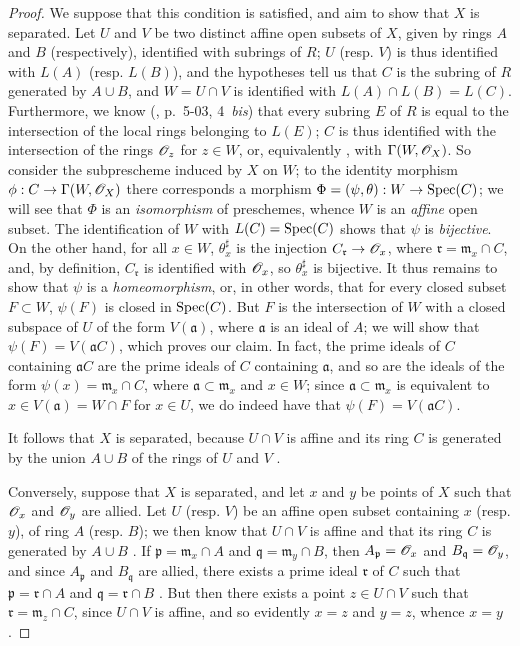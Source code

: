 \begin{proof}
\label{proof-1.8.2.2}
We suppose that this condition is satisfied, and aim to show that $X$ is separated.
Let $U$ and $V$ be two distinct affine open subsets of $X$, given by rings $A$ and $B$ (respectively), identified with subrings of $R$;
$U$ (resp. $V$) is thus identified  with $L(A)$ (resp. $L(B)$), and the hypotheses tell us  that $C$ is the subring of $R$ generated by $A\cup B$, and $W=U\cap V$ is identified with $L(A)\cap L(B)=L(C)$.
Furthermore, we know (\cite{I-1}, p.~5-03, 4~\emph{bis}) that every subring $E$ of $R$ is equal to the intersection of the local rings belonging to $L(E)$;
$C$ is thus identified with the intersection of the rings $\mathscr{O}_z$ for $z\in W$, or, equivalently , with $\Gamma(W,\mathscr{O}_X)$.
So consider the subprescheme induced by $X$ on $W$;
to the identity morphism $\vphi: C\to\Gamma(W,\sh{O}_X)$ there corresponds  a morphism $\Phi=(\psi,\theta):W\to\Spec(C)$;
we will see that $\Phi$ is an \emph{isomorphism} of preschemes, whence $W$ is an \emph{affine} open subset.
The identification of $W$ with $L(C)=\operatorname{Spec}(C)$ shows that $\psi$ is \emph{bijective}.
On the other hand, for all $x\in W$, $\theta_x^\sharp$ is the injection $C_\mathfrak{r}\to\sh{O}_x$, where $\mathfrak{r}=\mathfrak{m}_x\cap C$, and, by definition, $C_\mathfrak{r}$ is identified with $\mathscr{O}_x$, so $\theta_x^\sharp$ is bijective.
It thus remains to show that $\psi$ is a \emph{homeomorphism}, or, in other words, that for every closed subset $F\subset W$, $\psi(F)$ is closed in
$\operatorname{Spec}(C)$.
But $F$ is the intersection of $W$ with a closed subspace of $U$ of the form $V(\mathfrak{a})$, where $\mathfrak{a}$ is an ideal of $A$;
we will show that $\psi(F)=V(\mathfrak{a}C)$, which proves our claim.
In fact, the prime ideals of $C$ containing $\mathfrak{a}C$ are the prime ideals of $C$ containing $\mathfrak{a}$, and so are the ideals of the form $\psi(x)=\mathfrak{m}_x\cap C$, where $\mathfrak{a}\subset\mathfrak{m}_x$ and $x\in W$;
since $\mathfrak{a}\subset\mathfrak{m}_x$ is equivalent to $x\in V(\mathfrak{a})=W\cap F$ for $x\in U$, we do indeed have that $\psi(F)=V(\mathfrak{a}C)$.

It follows that $X$ is separated, because $U\cap V$ is affine and its ring $C$ is generated by the union $A\cup B$ of the rings of $U$ and $V$ .

Conversely, suppose that $X$ is separated, and let $x$ and $y$ be points of $X$ such that $\mathscr{O}_x$ and $\mathscr{O}_y$ are allied.
Let $U$ (resp. $V$) be an affine open subset containing $x$ (resp. $y$), of ring $A$ (resp. $B$);
we then know that $U\cap V$ is affine and that its ring $C$ is generated by $A\cup B$ .
If $\mathfrak{p}=\mathfrak{m}_x\cap A$ and $\mathfrak{q}=\mathfrak{m}_y\cap B$, then $A_\mathfrak{p}=\mathscr{O}_x$ and $B_\mathfrak{q}=\mathscr{O}_y$, and since $A_\mathfrak{p}$ and $B_\mathfrak{q}$ are allied, there exists a prime ideal $\mathfrak{r}$ of $C$ such that $\mathfrak{p}=\mathfrak{r}\cap A$ and $\mathfrak{q}=\mathfrak{r}\cap B$ .
But then there exists a point $z\in U\cap V$ such that $\mathfrak{r}=\mathfrak{m}_z\cap C$, since $U\cap V$ is affine, and so evidently $x=z$ and $y=z$, whence $x=y$.
\end{proof}

